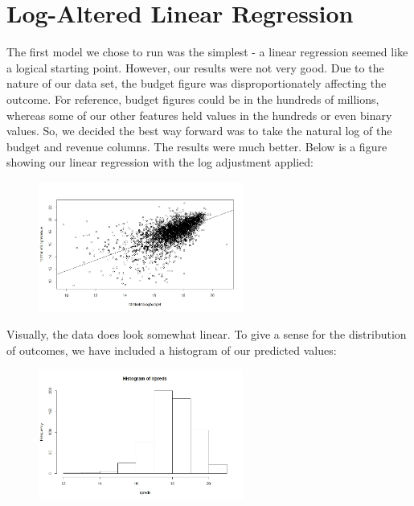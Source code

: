 \documentclass{article}
\begin{document}
\section*{Log-Altered Linear Regression}
\vspace{0.2in}

The first model we chose to run was the simplest - a linear regression seemed like a logical starting point. However, our results were not very good. Due to the nature of our data set, the budget figure was disproportionately affecting the outcome. For reference, budget figures could be in the hundreds of millions, whereas some of our other features held values in the hundreds or even binary values. So, we decided the best way forward was to take the natural log of the budget and revenue columns. The results were much better. Below is a figure showing our linear regression with the log adjustment applied:

\begin{figure}[ht]
\centering
\includegraphics[width = 0.6\textwidth]{logbudgvlogrev}
\end{figure}

Visually, the data does look somewhat linear. To give a sense for the distribution of outcomes, we have included a histogram of our predicted values:

\begin{figure}[ht]
\centering
\includegraphics[width = 0.6\textwidth]{histpred}
\end{figure}
\end{document}
